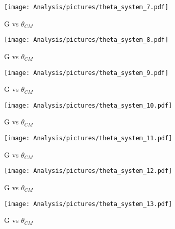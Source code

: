 \begin{figure}[htb]
  \begin{center}
    \texttt{[image: Analysis/pictures/theta\_system\_7.pdf]} \\
    \caption{G vs $\theta_{CM}$ }
    \label{fig:Gvstheta_W8}
  \end{center}
\end{figure}
\begin{figure}[htb]
  \begin{center}
    \texttt{[image: Analysis/pictures/theta\_system\_8.pdf]} \\
    \caption{G vs $\theta_{CM}$ }
    \label{fig:Gvstheta_W9}
  \end{center}
\end{figure}
\begin{figure}[htb]
  \begin{center}
    \texttt{[image: Analysis/pictures/theta\_system\_9.pdf]} \\
    \caption{G vs $\theta_{CM}$ }
    \label{fig:Gvstheta_W10}
  \end{center}
\end{figure}
\begin{figure}[htb]
  \begin{center}
    \texttt{[image: Analysis/pictures/theta\_system\_10.pdf]} \\
    \caption{G vs $\theta_{CM}$}
    \label{fig:Gvstheta_W11}
  \end{center}
\end{figure}
\begin{figure}[htb]
  \begin{center}
    \texttt{[image: Analysis/pictures/theta\_system\_11.pdf]} \\
    \caption{G vs $\theta_{CM}$ }
    \label{fig:Gvstheta_W12}
  \end{center}
\end{figure}
\begin{figure}[htb]
  \begin{center}
    \texttt{[image: Analysis/pictures/theta\_system\_12.pdf]} \\
    \caption{G vs $\theta_{CM}$ }
    \label{fig:Gvstheta_W13}
  \end{center}
\end{figure}
\begin{figure}[htb]
  \begin{center}
    \texttt{[image: Analysis/pictures/theta\_system\_13.pdf]} \\
    \caption{G vs $\theta_{CM}$ }
    \label{fig:Gvstheta_W14}
  \end{center}
\end{figure}
